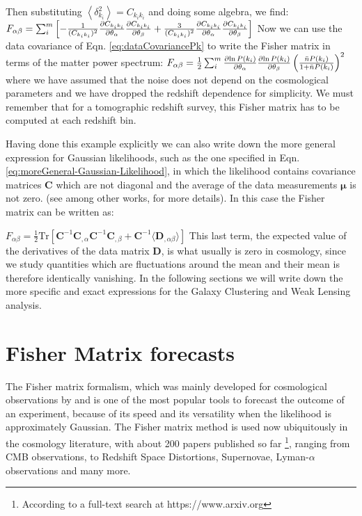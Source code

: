 Then substituting $\left\langle \delta^2_{k_i} \right\rangle = C_{k_{i} k_{i}}$
and doing some algebra, we find:
\beeqp$ \label{eq:Fisher-fromloglik-second}
F_{\alpha \beta} = \sum_{i}^{m} \left[-
 \frac{1}{(C_{k_{i} k_{i}})^2}\frac{\partial{C_{k_{i} k_{i}}}}{\partial{\theta_{\alpha}}}\frac{\partial{C_{k_{i} k_{i}}}}{\partial{\theta_{\beta}}}
+ \frac{3}{(C_{k_{i} k_{i}})^2}\frac{\partial{C_{k_{i} k_{i}}}}{\partial{\theta_{\alpha}}}\frac{\partial{C_{k_{i} k_{i}}}}{\partial{\theta_{\beta}}} \right] 
$
Now we can use the data covariance of Eqn. \ref{eq:dataCovariancePk} to write the Fisher matrix in terms of the matter power
spectrum:
\beeqc$ \label{eq:Fisher-fromloglik-inPk}
F_{\alpha \beta} = \frac{1}{2}\sum_{i}^{m} 
 \frac{\partial{\ln P(k_i)}}{\partial{\theta_{\alpha}}}\frac{\partial{\ln P(k_i)}}{\partial{\theta_{\beta}}}
\left(  \frac{\bar{n} P(k_i)}{1+\bar{n} P(k_i)}  \right)^2
$
where we have assumed that the noise does not depend on the cosmological parameters and we have dropped
the redshift dependence for simplicity. We must remember that for a tomographic redshift survey,
this Fisher matrix has to be computed at each redshift bin.

Having done this example explicitly we can also write down the more general expression for Gaussian likelihoods, such as the one
specified in Eqn.\ref{eq:moreGeneral-Gaussian-Likelihood}, in which
the likelihood contains covariance matrices $\bm C$ which are not diagonal and the average
of the data measurements $\bm \mu$ is not zero. (see \cite{cite Luca, Dodelson}
among other works, for more details). In this case the Fisher matrix can be written as:

\beeq$ \label{eq:Fisher-MatrixForm-GaussianGeneral}
F_{\alpha \beta} = \frac{1}{2}\mathrm{Tr}\left[\bm{C}^{-1}\bm{C}_{,\alpha}\bm{C}^{-1}\bm{C}_{,\beta}
+ \bm{C}^{-1}\langle \bm{D}_{,\alpha \beta} \rangle  
\right]
$
This last term, the expected value of the derivatives of the data matrix $\bm D$, is what usually is zero
in cosmology, since we study quantities which are fluctuations around the mean and their mean is therefore identically
vanishing.
In the following sections we will write down the more specific and exact expressions for 
the Galaxy Clustering and Weak Lensing analysis.

\section{\label{sec:Fisher-Matrix-forecasts}Fisher Matrix forecasts}

The Fisher matrix formalism, which was mainly developed for cosmological observations by
\cite{tegmark_measuring_1998} and \cite{seo_baryonic_2005}
is one of the most popular tools to forecast the outcome of an experiment,
because of its speed and its versatility when the likelihood is approximately
Gaussian. 
The Fisher matrix method is used now ubiquitously in the cosmology literature, 
with about 200 papers published so far \footnote{According to a full-text search at https://www.arxiv.org}, ranging from CMB observations,
to Redshift Space Distortions, Supernovae, Lyman-$\alpha$ observations and many more.


